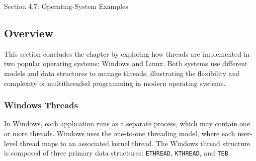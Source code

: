 \begin{notes}{Section 4.7: Operating-System Examples}
    \subsection*{Overview}

    This section concludes the chapter by exploring how threads are implemented in two popular operating systems: Windows and Linux. Both systems use different models and data structures to manage 
    threads, illustrating the flexibility and complexity of multithreaded programming in modern operating systems.
    
    \subsubsection*{Windows Threads}
    
    In Windows, each application runs as a separate process, which may contain one or more threads. Windows uses the one-to-one threading model, where each user-level thread maps to an associated kernel 
    thread. The Windows thread structure is composed of three primary data structures: \texttt{ETHREAD}, \texttt{KTHREAD}, and \texttt{TEB}.
    
    \begin{highlight}
    

\end{highlight}
\end{notes}
